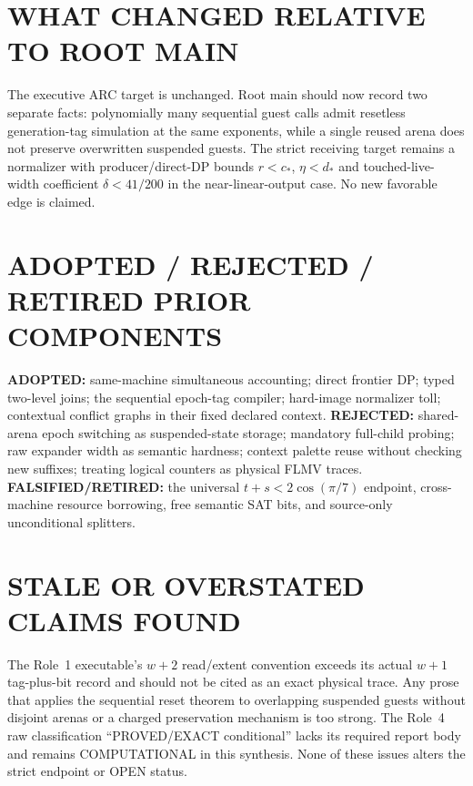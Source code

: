 \documentclass[11pt]{article}
\begin{document}
\section{WHAT CHANGED RELATIVE TO ROOT MAIN}
The executive ARC target is unchanged.  Root main should now record two
separate facts: polynomially many sequential guest calls admit resetless
generation-tag simulation at the same exponents, while a single reused arena
does not preserve overwritten suspended guests.  The strict receiving target
remains a normalizer with producer/direct-DP bounds
$r<c_*$, $\eta<d_*$ and touched-live-width coefficient
$\delta<41/200$ in the near-linear-output case.  No new favorable edge is
claimed.

\section{ADOPTED / REJECTED / RETIRED PRIOR COMPONENTS}
\textbf{ADOPTED:} same-machine simultaneous accounting; direct frontier DP;
typed two-level joins; the sequential epoch-tag compiler; hard-image
normalizer toll; contextual conflict graphs in their fixed declared context.
\textbf{REJECTED:} shared-arena epoch switching as suspended-state storage;
mandatory full-child probing; raw expander width as semantic hardness;
context palette reuse without checking new suffixes; treating logical counters
as physical FLMV traces.  \textbf{FALSIFIED/RETIRED:} the universal
$t+s<2\cos(\pi/7)$ endpoint, cross-machine resource borrowing, free semantic
SAT bits, and source-only unconditional splitters.

\section{STALE OR OVERSTATED CLAIMS FOUND}
The Role~1 executable's $w+2$ read/extent convention exceeds its actual
$w+1$ tag-plus-bit record and should not be cited as an exact physical trace.
Any prose that applies the sequential reset theorem to overlapping suspended
guests without disjoint arenas or a charged preservation mechanism is too
strong.  The Role~4 raw classification ``PROVED/EXACT conditional'' lacks its
required report body and remains COMPUTATIONAL in this synthesis.  None of
these issues alters the strict endpoint or OPEN status.
\end{document}
